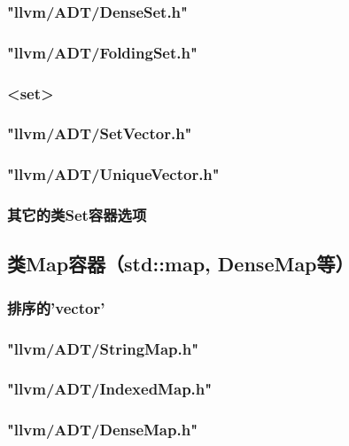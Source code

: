 \documentclass[12pt,a4paper]{article}
\begin{document}
\subsubsection{"llvm/ADT/DenseSet.h"}

\subsubsection{"llvm/ADT/FoldingSet.h"}

\subsubsection{<set>}

\subsubsection{"llvm/ADT/SetVector.h"}

\subsubsection{"llvm/ADT/UniqueVector.h"}

\subsubsection{其它的类Set容器选项}

\subsection{类Map容器（std::map, DenseMap等）}

\subsubsection{排序的'vector'}

\subsubsection{"llvm/ADT/StringMap.h"}

\subsubsection{"llvm/ADT/IndexedMap.h"}

\subsubsection{"llvm/ADT/DenseMap.h"}
\end{document}
